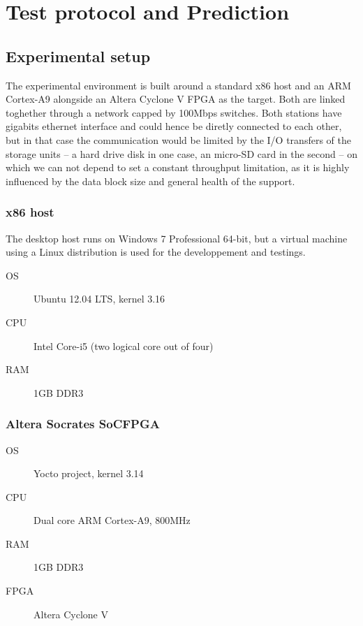 \chapter{Test protocol and Prediction}

\section{Experimental setup}
The experimental environment is built around a standard x86 host and an ARM Cortex-A9 alongside an Altera Cyclone V FPGA as the target.
Both are linked toghether through a network capped by 100Mbps switches.
Both stations have gigabits ethernet interface and could hence be diretly connected to each other, but in that case the communication would be limited by the I/O transfers of the storage units -- a hard drive disk in one case, an micro-SD card in the second -- on which we can not depend to set a constant throughput limitation, as it is highly influenced by the data block size and general health of the support.


\subsection{x86 host}
The desktop host runs on Windows 7 Professional 64-bit, but a virtual machine using a Linux distribution is used for the developpement and testings.

\begin{framed}
\begin{description}
	\item[OS] Ubuntu 12.04 LTS, kernel 3.16
	\item[CPU] Intel Core-i5 (two logical core out of four)
	\item[RAM] 1GB DDR3
\end{description}
\end{framed}

\subsection{Altera Socrates SoCFPGA}

\begin{framed}
\begin{description}
	\item[OS] Yocto project, kernel 3.14
	\item[CPU] Dual core ARM Cortex-A9, 800MHz
	\item[RAM] 1GB DDR3
	\item[FPGA] Altera Cyclone V
\end{description}
\end{framed}

